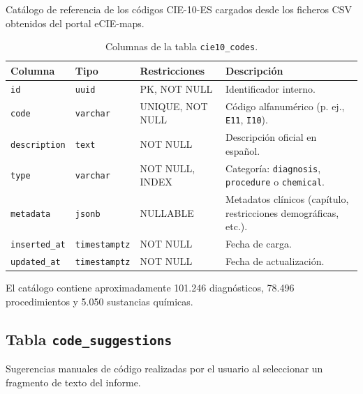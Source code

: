 Catálogo de referencia de los códigos CIE-10-ES cargados desde los ficheros CSV obtenidos del portal eCIE-maps.

\begin{table}[h]
\centering
\caption{Columnas de la tabla \texttt{cie10\_codes}.}
\label{tab:cie10codes}
\begin{tabular}{llp{3.5cm}p{4.5cm}}
\hline
\textbf{Columna} & \textbf{Tipo} & \textbf{Restricciones} & \textbf{Descripción} \\
\hline
\texttt{id}          & \texttt{uuid}    & PK, NOT NULL       & Identificador interno. \\
\texttt{code}        & \texttt{varchar} & UNIQUE, NOT NULL   & Código alfanumérico (p. ej., \texttt{E11}, \texttt{I10}). \\
\texttt{description} & \texttt{text}    & NOT NULL           & Descripción oficial en español. \\
\texttt{type}        & \texttt{varchar} & NOT NULL, INDEX    & Categoría: \texttt{diagnosis}, \texttt{procedure} o \texttt{chemical}. \\
\texttt{metadata}    & \texttt{jsonb}   & NULLABLE           & Metadatos clínicos (capítulo, restricciones demográficas, etc.). \\
\texttt{inserted\_at}& \texttt{timestamptz} & NOT NULL       & Fecha de carga. \\
\texttt{updated\_at} & \texttt{timestamptz} & NOT NULL       & Fecha de actualización. \\
\hline
\end{tabular}
\end{table}

El catálogo contiene aproximadamente 101.246 diagnósticos, 78.496 procedimientos y 5.050 sustancias químicas.

\subsection{Tabla \texttt{code\_suggestions}}

Sugerencias manuales de código realizadas por el usuario al seleccionar un fragmento de texto del informe.

